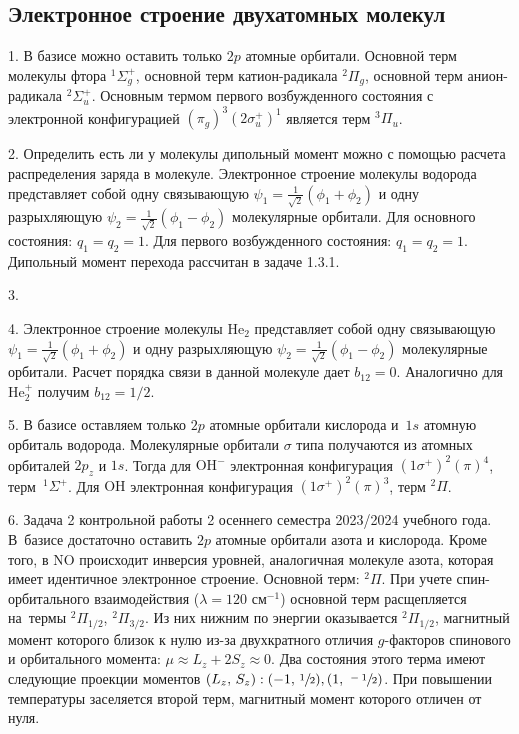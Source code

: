 \subsection{Электронное строение двухатомных молекул}
1. В базисе можно оставить только $2p$ атомные орбитали. Основной терм молекулы фтора $^1\Sigma_g^+$, основной терм катион-радикала $^2\Pi_g$, основной терм анион-радикала $^2\Sigma_u^+$. Основным термом первого возбужденного состояния с электронной конфигурацией $(\pi_g)^3(2\sigma_u^+)^1$ является терм $^3\Pi_u$.\par
2. Определить есть ли у молекулы дипольный момент можно с помощью расчета распределения заряда в молекуле. Электронное строение молекулы водорода представляет собой одну связывающую $\psi_1=\frac{1}{\sqrt2}(\phi_1+\phi_2)$ и одну разрыхляющую $\psi_2=\frac{1}{\sqrt2}(\phi_1-\phi_2)$ молекулярные орбитали. Для основного состояния: $q_1=q_2=1$. Для первого возбужденного состояния: $q_1=q_2=1$. Дипольный момент перехода рассчитан в задаче 1.3.1.\par
3. \par
4. Электронное строение молекулы $\text{He}_2$ представляет собой одну связывающую $\psi_1=\frac{1}{\sqrt2}(\phi_1+\phi_2)$ и одну разрыхляющую $\psi_2=\frac{1}{\sqrt2}(\phi_1-\phi_2)$ молекулярные орбитали. Расчет порядка связи в данной молекуле дает $b_{12}=0$. Аналогично для $\text{He}_2^{+}$ получим $b_{12}=1/2$.\par
5. В базисе оставляем только $2p$ атомные орбитали кислорода и~$1s$ атомную орбиталь водорода. Молекулярные орбитали $\sigma$ типа получаются из атомных орбиталей $2p_z$ и $1s$. Тогда для $\text{OH}^-$ электронная конфигурация $(1\sigma^+)^2(\pi)^4$, терм~$^1\Sigma^+$. Для $\text{OH}$ электронная конфигурация $(1\sigma^+)^2(\pi)^3$, терм $^2\Pi$.\par
6. Задача 2 контрольной работы 2 осеннего семестра 2023/2024 учебного года. В~базисе достаточно оставить $2p$ атомные орбитали азота и кислорода. Кроме того, в NO происходит инверсия уровней, аналогичная молекуле азота, которая имеет идентичное электронное строение. Основной терм: $^2\Pi$. При учете спин-орбитального взаимодействия ($\lambda=120$ см$^{-1}$) основной терм расщепляется на~термы $^2\Pi_{1/2}$, $^2\Pi_{3/2}$. Из них нижним по энергии оказывается $^2\Pi_{1/2}$, магнитный момент которого близок к нулю из-за двухкратного отличия $g$-факторов спинового и орбитального момента: $\mu \approx L_z + 2S_z \approx 0$. Два состояния этого терма имеют следующие проекции моментов $(L_z,\,S_z): (-1,\,\sfrac12), (1,\,\sfrac{-1}{2})$.  При повышении температуры заселяется второй терм, магнитный момент которого отличен от нуля.\par
